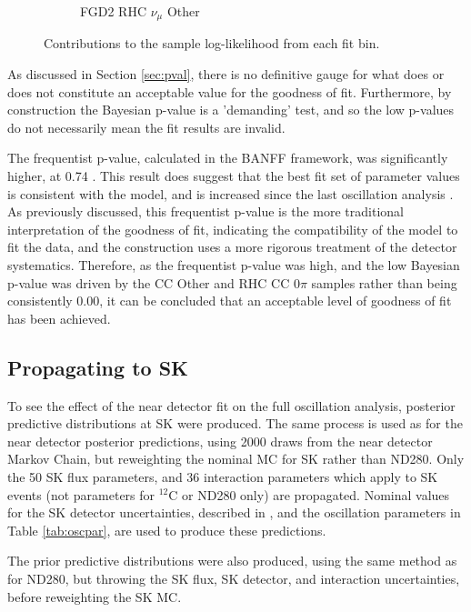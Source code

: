 \begin{figure}
\begin{subfigure}{.32\textwidth}
  \caption{FGD2 RHC $\nu_{\mu}$ Other}
  \label{fig:llhcont_FGD2_NuMuBkg_CCOther_in_AntiNu_Mode}
\end{subfigure}
\caption{Contributions to the sample log-likelihood from each fit bin.}
\label{fig:llhconts}
\end{figure}

As discussed in Section \ref{sec:pval}, there is no definitive gauge for what does or does not constitute an acceptable value for the goodness of fit. Furthermore, by construction the Bayesian p-value is a 'demanding' test, and so the low p-values do not necessarily mean the fit results are invalid. 

The frequentist p-value, calculated in the BANFF framework, was significantly higher, at 0.74 \cite{tn395}. This result does suggest that the best fit set of parameter values is consistent with the model, and is increased since the last oscillation analysis \cite{tn324}. As previously discussed, this frequentist p-value is the more traditional interpretation of the goodness of fit, indicating the compatibility of the model to fit the data, and the construction uses a more rigorous treatment of the detector systematics. Therefore, as the frequentist p-value was high, and the low Bayesian p-value was driven by the CC Other and RHC CC $0\pi$ samples rather than being consistently 0.00, it can be concluded that an acceptable level of goodness of fit has been achieved.

\subsection{Propagating to SK}

To see the effect of the near detector fit on the full oscillation analysis, posterior predictive distributions at SK were produced. The same process is used as for the near detector posterior predictions, using 2000 draws from the near detector Markov Chain, but reweighting the nominal MC for SK rather than ND280. Only the 50 SK flux parameters, and 36 interaction parameters which apply to SK events (not parameters for $^{12}$C or ND280 only) are propagated. Nominal values for the SK detector uncertainties, described in \cite{tn399}, and the oscillation parameters in Table \ref{tab:oscpar}, are used to produce these predictions.

The prior predictive distributions were also produced, using the same method as for ND280, but throwing the SK flux, SK detector, and interaction uncertainties, before reweighting the SK MC.

